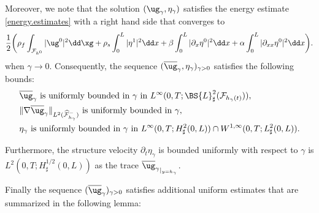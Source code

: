Moreover, we note that the solution $(\ug_{\gamma},\eta_{\gamma})$ satisfies the energy estimate \eqref{energy.estimates} with a right hand side that converges to
\[
\frac{1}{2}\biggl(\rho_{f}\int_{\mathcal{F}_{h^0}}\vert\ug^0\vert^{2} \dd \xg+ \rho_{s}\int_{0}^{L}\vert\eta^1\vert^{2}\dd x+\beta\int_{0}^{L}\vert\partial_{x}\eta^0\vert^{2}\dd x+\alpha\int_{0}^{L}\vert\partial_{xx}\eta^0\vert^{2}\dd x\biggr).
\]
when $\gamma \to 0$.
Consequently, the sequence $(\overline{\ug}_{\gamma},\eta_{\gamma})_{\gamma >0}$ satisfies the following bounds:
\begin{align}
&\overline{\ug}_{\gamma}\text{ is uniformly bounded in }\gamma\text{ in }L^{\infty}(0,T;\BS{L}_\sharp^{2}(\mathcal{F}_{h_{\gamma}(t)})),\label{bound-u-1}\\
&\|\nabla\overline{\ug}_{\gamma}\|_{L^2(\widehat{\mathcal F}^{-}_{h_{\gamma}})} \text{ is uniformly bounded in }\gamma,
\label{bound-u-2}\\
&\eta_{\gamma}\text{ is uniformly bounded in }\gamma\text{ in }L^{\infty}(0,T;H^{2}_{\sharp}(0,L))\cap W^{1,\infty}(0,T;L_\sharp^{2}(0,L)).\label{est-eta}
\end{align}

Furthermore, the structure velocity $\partial_t\eta_\gamma$ is bounded uniformly with respect to $\gamma$ is $L^2(0, T ; H^{1/2}_\sharp(0, L))$ as the trace ${\overline{\ug}_{\gamma}}_{\vert_{y=h_{\gamma}}}$.

Finally the sequence $(\overline{\ug}_{\gamma})_{\gamma>0}$ satisfies additional uniform estimates that are summarized in the following lemma:

